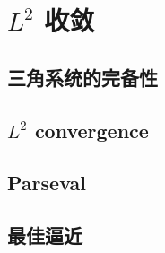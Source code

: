 \section{\texorpdfstring{\(L^2\)}{L²} 收敛}
\label{b2:sec:0203}


\subsection{三角系统的完备性}
\label{b2:subsec:020301}

\subsection{\texorpdfstring{\(L^2\)}{L2} convergence}
\label{b2:subsec:020302}

\subsection{Parseval}
\label{b2:subsec:020303}

\subsection{最佳逼近}
\label{b2:subsec:020304}


